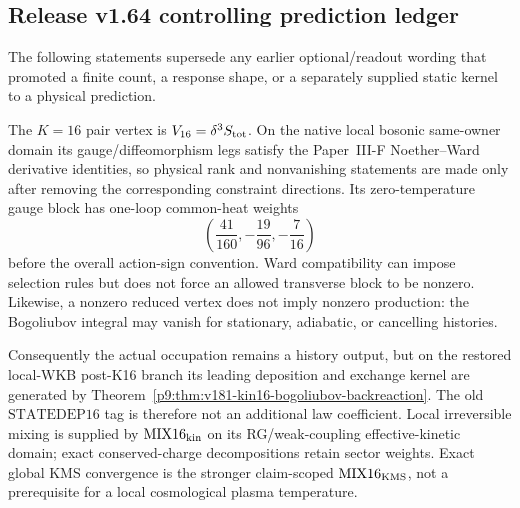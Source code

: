 \documentclass[12pt,a4paper]{article}
\begin{document}
\subsection{Release v1.64 controlling prediction ledger}
\label{p9:sec:v164-controlling-prediction-ledger}

The following statements supersede any earlier optional/readout wording that
promoted a finite count, a response shape, or a separately supplied static
kernel to a physical prediction.

\begin{theorem}
\label{p9:thm:v164-k16-state-history-readout}
The \(K=16\) pair vertex is \(V_{16}=\delta^3S_{\rm tot}\).  On the native
local bosonic same-owner domain its gauge/diffeomorphism legs satisfy the
Paper~III-F Noether--Ward derivative identities, so physical rank and
nonvanishing statements are made only after removing the corresponding
constraint directions.  Its zero-temperature gauge block has one-loop
common-heat weights
\[
 \left(\frac{41}{160},-\frac{19}{96},-\frac7{16}\right)
\]
before the overall action-sign convention.  Ward compatibility can impose
selection rules but does not force an allowed transverse block to be nonzero.
Likewise, a nonzero reduced vertex does not imply nonzero production: the
Bogoliubov integral may vanish for stationary, adiabatic, or cancelling
histories.

Consequently the actual occupation remains a history output, but on the
restored local-WKB post-K16 branch its leading deposition and exchange kernel are generated by
Theorem~\ref{p9:thm:v181-kin16-bogoliubov-backreaction}.  The old
\(\mathrm{STATEDEP16}\) tag is therefore not an additional law coefficient.
Local irreversible mixing is supplied by \(\mathrm{MIX16}_{\rm kin}\) on its
RG/weak-coupling effective-kinetic domain; exact conserved-charge decompositions
retain sector weights.  Exact global KMS convergence is the stronger
claim-scoped \(\mathrm{MIX16}_{\rm KMS}\), not a prerequisite for a local
cosmological plasma temperature.
\end{theorem}
\end{document}
